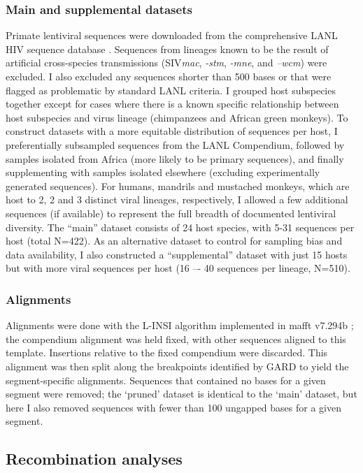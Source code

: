 \subsubsection*{Main and supplemental datasets}
Primate lentiviral sequences were downloaded from the comprehensive LANL HIV sequence database \citep{los2012hiv}.
Sequences from lineages known to be the result of artificial cross-species transmissions (SIV\textit{mac}, \textit{-stm}, \textit{-mne}, and \textit{–wcm}) were excluded.
I also excluded any sequences shorter than 500 bases or that were flagged as problematic by standard LANL criteria.
I grouped host subspecies together except for cases where there is a known specific relationship between host subspecies and virus lineage (chimpanzees and African green monkeys).
To construct datasets with a more equitable distribution of sequences per host, I preferentially subsampled sequences from the LANL Compendium, followed by samples isolated from Africa (more likely to be primary sequences), and finally supplementing with samples isolated elsewhere (excluding experimentally generated sequences).
For humans, mandrils and mustached monkeys, which are host to 2, 2 and 3 distinct viral lineages, respectively, I allowed a few additional sequences (if available) to represent the full breadth of documented lentiviral diversity.
The “main” dataset consists of 24 host species, with 5-31 sequences per host (total N=422).
As an alternative dataset to control for sampling bias and data availability, I also constructed a “supplemental” dataset with just 15 hosts but with more viral sequences per host (16 –- 40 sequences per lineage, N=510).

\subsubsection*{Alignments}
Alignments were done with the L-INSI algorithm implemented in mafft v7.294b \citep{katoh2013mafft}; the compendium alignment was held fixed, with other sequences aligned to this template.
Insertions relative to the fixed compendium were discarded.
This alignment was then split along the breakpoints identified by GARD to yield the segment-specific alignments.
Sequences that contained no bases for a given segment were removed; the `pruned' dataset is identical to the `main' dataset, but here I also removed sequences with fewer than 100 ungapped bases for a given segment.

\subsection*{Recombination analyses}
